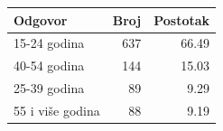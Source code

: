 \begin{tabular}{lrr}
\toprule
Odgovor & Broj & Postotak \\
\midrule
15-24 godina & 637 & 66.49 \\
40-54 godina & 144 & 15.03 \\
25-39 godina & 89 & 9.29 \\
55 i više godina & 88 & 9.19 \\
\bottomrule
\end{tabular}
